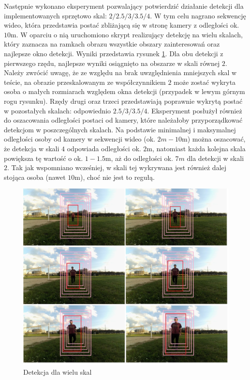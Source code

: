 Następnie wykonano eksperyment pozwalający potwierdzić działanie detekcji dla implementowanych sprzętowo skal: $2/2.5/3/3.5/4$. W tym celu nagrano sekwencję wideo, która przedstawia postać zbliżającą się w stronę kamery z odległości ok. $10$m. W oparciu o nią uruchomiono skrypt realizujący detekcję na wielu skalach, który zaznacza na ramkach obrazu wszystkie obszary zainteresowań oraz najlepsze okno detekcji. Wyniki przedstawia rysunek \ref{fig:SVMmodel_dist}. Dla obu detekcji z pierwszego rzędu, najlepsze wyniki osiągnięto na obszarze w skali równej $2$. Należy zwrócić uwagę, że ze względu na brak uwzględnienia mniejszych skal w teście, na obrazie przeskalowanym ze współczynnikiem $2$ może zostać wykryta osoba o małych rozmiarach względem okna detekcji (przypadek w lewym górnym rogu rysunku). Rzędy drugi oraz trzeci przedstawiają poprawnie wykrytą postać w pozostałych skalach: odpowiednio $2.5/3/3.5/4$. \newline
Eksperyment posłużył również do oszacowania odległości postaci od kamery, które należałoby przyporządkować detekcjom w poszczególnych skalach. Na podstawie minimalnej i maksymalnej odległości osoby od kamery w sekwencji wideo (ok. $2m-10$m) można oszacować, że detekcja w skali $4$ odpowiada odległości ok. $2$m, natomiast każda kolejna skala powiększa tę wartość o ok. $1-1.5$m, aż do odległości ok. $7m$ dla detekcji w skali $2$. Tak jak wspomniano wcześniej, w skali tej wykrywana jest również dalej stojąca osoba (nawet $10$m), choć nie jest to regułą.
\begin{figure}[h]
	\centering
	\includegraphics[width=15cm]{HOG_scale_all.jpg}
	\caption{Detekcja dla wielu skal}
	\label{fig:SVMmodel_dist}
\end{figure}

